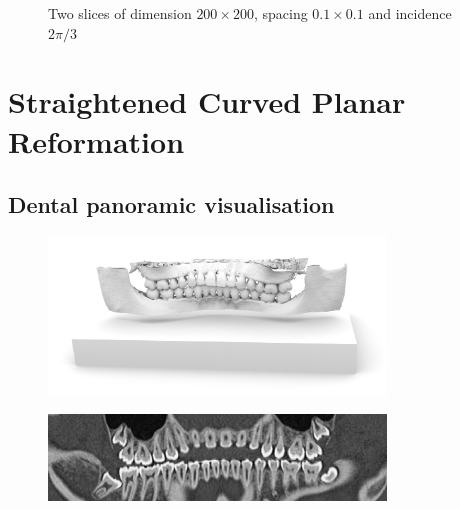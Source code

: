 \documentclass{InsightArticle}
\begin{document}
\begin{figure}
\centering
{}
\caption{Two slices of dimension $200\times200$, spacing $0.1\times0.1$ and
incidence $2\pi/3$}
\label{fig:mandibule_slices}
\end{figure}
%
%
\section{Straightened Curved Planar Reformation}
%
\cite{KAN01}
%
\subsection{Dental panoramic visualisation}
\begin{figure}
\centering
\includegraphics[width=0.8\textwidth]{Images/pano_blender.png}
\end{figure}
%
\begin{figure}
\centering
\includegraphics[width=0.8\textwidth]{Images/pano_paraview.png}
\end{figure}
%
\end{document}
